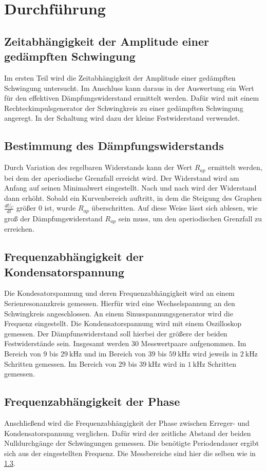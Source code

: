\section{Durchführung}
\label{sec:durchfuehrung}

\subsection{Zeitabhängigkeit der Amplitude einer gedämpften Schwingung}
Im ersten Teil wird die Zeitabhängigkeit der Amplitude einer gedämpften Schwingung untersucht. Im Anschluss kann 
daraus in der Auswertung ein Wert für den effektiven Dämpfungswiderstand ermittelt werden. 
Dafür wird mit einem Rechteckimpulsgenerator der Schwingkreis zu einer gedämpften Schwingung angeregt. %
In der Schaltung wird dazu der kleine Festwiderstand verwendet.

\subsection{Bestimmung des Dämpfungswiderstands}
Durch Variation des regelbaren Widerstands kann der Wert $R_{ap}$ ermittelt werden, bei dem der aperiodische
Grenzfall erreicht wird.
Der Widerstand wird am Anfang auf seinen Minimalwert eingestellt. Nach und nach wird der Widerstand dann erhöht. %
Sobald ein Kurvenbereich auftritt, in dem die Steigung des Graphen $\frac{dU_{C}}{dt}$ größer 0 ist, wurde 
$R_{ap}$ überschritten. Auf diese Weise lässt sich ablesen, wie groß der Dämpfungswiderstand $R_{ap}$
sein muss, um den aperiodischen Grenzfall zu erreichen.

\subsection{Frequenzabhängigkeit der Kondensatorspannung}
\label{sec:c}
Die Kondesatorspannung und deren Frequenzabhängigkeit wird an einem Serienresonanzkreis gemessen. Hierfür wird eine 
Wechselspannung an den Schwingkreis angeschlossen. An einem Sinusspannungsgenerator wird die Frequenz eingestellt.
Die Kondensatorspannung wird mit einem Oszilloskop gemessen. Der Dämpfunswiderstand soll hierbei der 
größere der beiden Festwiderstände sein. %
Insgesamt werden 30 Messwertpaare aufgenommen. Im Bereich von $\num{9}$ bis $\SI{29}{\kilo\hertz}$ und
im Bereich von $\num{39}$ bis $\SI{59}{\kilo\hertz}$ wird jeweils in $\SI{2}{\kilo\hertz}$ Schritten
gemessen. Im Bereich von $\num{29}$ bis $\SI{39}{\kilo\hertz}$ wird in $\SI{1}{\kilo\hertz}$ Schritten
gemessen.

\subsection{Frequenzabhängigkeit der Phase}
Anschließend wird die Frequenzabhängigkeit der Phase zwischen Erreger- und Kondensatorspannung verglichen. Dafür 
wird der zeitliche Abstand der beiden Nulldurchgänge der Schwingungen gemessen. Die benötigte Periodendauer ergibt sich aus der eingestellten
Frequenz. Die Messbereiche sind hier die selben wie in \ref{sec:c}.